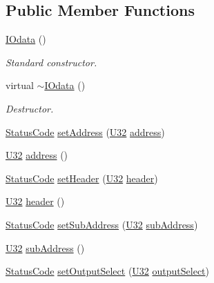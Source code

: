 \subsection*{Public Member Functions}
\begin{DoxyCompactItemize}
\item 
\hyperlink{classIOdata_af558c1fc49af58f50c9600423dd5acd7}{I\+Odata} ()
\begin{DoxyCompactList}\small\item\em Standard constructor. \end{DoxyCompactList}\item 
virtual \hyperlink{classIOdata_a3d7cf860040702b00a925703da7c0648}{$\sim$\+I\+Odata} ()
\begin{DoxyCompactList}\small\item\em Destructor. \end{DoxyCompactList}\item 
\hyperlink{classStatusCode}{Status\+Code} \hyperlink{classIOdata_af98cbfbc28346ebb9b64ca0203af1463}{set\+Address} (\hyperlink{classIOdata_a96fb57f5fcd87b708743abd3c86a5198}{U32} \hyperlink{classIOdata_afe410c86881b8c2082a08e5ce9843306}{address})
\item 
\hyperlink{classIOdata_a96fb57f5fcd87b708743abd3c86a5198}{U32} \hyperlink{classIOdata_afe410c86881b8c2082a08e5ce9843306}{address} ()
\item 
\hyperlink{classStatusCode}{Status\+Code} \hyperlink{classIOdata_a9a850f401542d416adf061e30f7dfdd5}{set\+Header} (\hyperlink{classIOdata_a96fb57f5fcd87b708743abd3c86a5198}{U32} \hyperlink{classIOdata_a503396d8deb6e098c15f963e4201e01b}{header})
\item 
\hyperlink{classIOdata_a96fb57f5fcd87b708743abd3c86a5198}{U32} \hyperlink{classIOdata_a503396d8deb6e098c15f963e4201e01b}{header} ()
\item 
\hyperlink{classStatusCode}{Status\+Code} \hyperlink{classIOdata_aeca09aa9a8c2ccc4c3a728b2ddcf4b2a}{set\+Sub\+Address} (\hyperlink{classIOdata_a96fb57f5fcd87b708743abd3c86a5198}{U32} \hyperlink{classIOdata_a25df48b84364a468373260f823ed9c5f}{sub\+Address})
\item 
\hyperlink{classIOdata_a96fb57f5fcd87b708743abd3c86a5198}{U32} \hyperlink{classIOdata_a25df48b84364a468373260f823ed9c5f}{sub\+Address} ()
\item 
\hyperlink{classStatusCode}{Status\+Code} \hyperlink{classIOdata_a09675d3efa14ba00cc22f8ff8d463389}{set\+Output\+Select} (\hyperlink{classIOdata_a96fb57f5fcd87b708743abd3c86a5198}{U32} \hyperlink{classIOdata_aaa410b57a4607857d45ac6a7cd013307}{output\+Select})

\end{DoxyCompactItemize}
